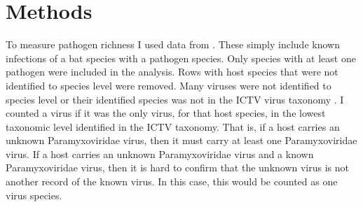 
\section{Methods}


























































To measure pathogen richness I used data from \cite{luis2013comparison}. 
These simply include known infections of a bat species with a pathogen species. 
Only species with at least one pathogen were included in the analysis.
Rows with host species that were not identified to species level were removed.
Many viruses were not identified to species level or their identified species was not in the ICTV virus taxonomy \cite{ICTV}.
I counted a virus if it was the only virus, for that host species, in the lowest taxonomic level identified in the ICTV taxonomy.
That is, if a host carries an unknown Paramyxoviridae virus, then it must carry at least one Paramyxoviridae virus.
If a host carries an unknown Paramyxoviridae virus and a known Paramyxoviridae virus, then it is hard to confirm that the unknown virus is not another record of the known virus.
In this case, this would be counted as one virus species.






